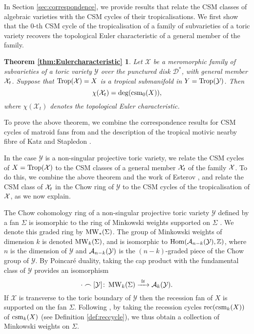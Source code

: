 In Section \ref{sec:correspondence}, we provide results that relate the CSM classes of algebraic varieties with the CSM cycles of their tropicalisations.
We first show that the $0$-th CSM cycle of the tropicalisation of a family of subvarieties of a toric variety recovers the topological Euler characteristic of a general member of the family.

\newtheorem*{thm:Eulercharacteristic}{Theorem \ref{thm:Eulercharacteristic}}
\begin{thm:Eulercharacteristic}
Let $\mathcal{X}$ be a meromorphic family of subvarieties of a toric variety $\mathcal{Y}$ over the punctured disk $\mathcal{D}^*$, with general member ${\mathcal X}_t$. Suppose that $\operatorname{Trop}(\mathcal{X}) = X$ is a tropical submanifold in $Y = \operatorname{Trop}(\mathcal{Y})$. Then 
$$\chi(\mathcal{X}_t) = \deg(\operatorname{csm}_0(X)),$$
where $\chi(\mathcal{X}_t)$ denotes the topological Euler characteristic. 
\end{thm:Eulercharacteristic}

To prove the  above theorem, we combine the correspondence  results for CSM cycles of matroid fans from \cite{LdMRS} and 
the description of the tropical motivic nearby fibre of Katz and Stapledon \cite{KatzStapledon}. 


In the case $\mathcal Y$ is a non-singular projective toric variety, we relate the CSM cycles of $X = \operatorname{Trop}(\mathcal{X})$ to the CSM classes of a general member ${\mathcal X}_t$ of the family ${\mathcal X}$.
To do this, we combine the above theorem and the work of Esterov \cite{Esterov}, and relate the CSM class of ${\mathcal X}_t$ in the Chow ring of $\mathcal{Y}$ to the CSM cycles of the tropicalisation of ${\mathcal X}$, as we now explain. 

The Chow cohomology ring of a non-singular projective toric variety $\mathcal Y$ defined by a fan $\Sigma$ is isomorphic to the ring of Minkowski weights supported on $\Sigma$ \cite{FultonSturmfels}. We denote this graded ring  by $\operatorname{MW}_{\ast}(\Sigma)$. 
The group of Minkowski weights of dimension $k$ is denoted $\operatorname{MW}_k(\Sigma)$, and is isomorphic to $\operatorname{Hom} ( {\mathcal A}_{n-k}(\mathcal{Y}) , {\mathbb Z})$, where $n$ is the dimension of $\mathcal Y$ and ${\mathcal A}_{n-k}(\mathcal{Y})$ is the $(n-k)$-graded piece of the Chow group of $\mathcal{Y}$. 
By Poincar\'e duality, taking the cap product with the fundamental class of $\mathcal{Y}$ provides an isomorphism
$$\cdot \frown  [\mathcal{Y}] \colon \operatorname{MW}_{k}(\Sigma) \xrightarrow{\,\,\cong\,\,} {\mathcal A}_{k}(\mathcal{Y}).$$
If $\mathcal{X}$ is transverse to the toric boundary of $\mathcal{Y}$ then the recession fan of $X$ is supported on the fan $\Sigma$. Following \cite{AHR}, by taking the recession cycles $\operatorname{rec}(\operatorname{csm}_k(X))$ of $\operatorname{csm}_k(X)$ (see Definition \ref{def:reccycle}), we thus obtain a collection of Minkowski weights on $\Sigma$.

